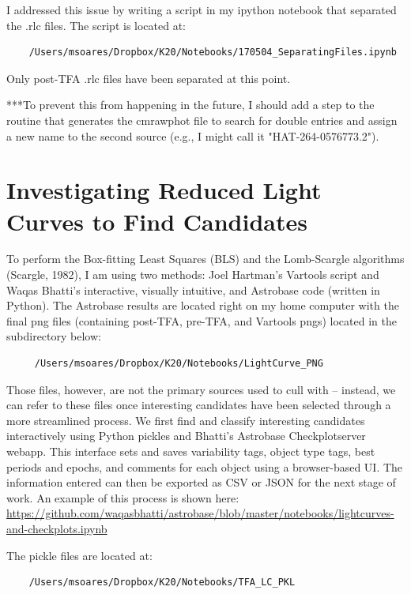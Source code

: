 \documentclass[11pt,letterpaper]{book} %
\begin{document}
I addressed this issue by writing a script in my ipython notebook that separated the .rlc files. The script is located at:
\begin{verbatim}
    /Users/msoares/Dropbox/K20/Notebooks/170504_SeparatingFiles.ipynb
\end{verbatim}

Only post-TFA .rlc files have been separated at this point. 

***To prevent this from happening in the future, I should add a step to the routine that generates the cmrawphot file to search for double entries and assign a new name to the second source (e.g., I might call it "HAT-264-0576773.2").


\chapter*{Investigating Reduced Light Curves to Find Candidates}
To perform the Box-fitting Least Squares (BLS) and the Lomb-Scargle algorithms (Scargle, 1982), I am using two methods: Joel Hartman's Vartools script and Waqas Bhatti's interactive, visually intuitive, and Astrobase code (written in Python). The Astrobase results are located right on my home computer with the final png files (containing post-TFA, pre-TFA, and Vartools pngs) located in the subdirectory below: 

\begin{verbatim}
     /Users/msoares/Dropbox/K20/Notebooks/LightCurve_PNG
\end{verbatim}

Those files, however, are not the primary sources used to cull with -- instead, we can refer to these files once interesting candidates have been selected through a more streamlined process.
We first find and classify interesting candidates interactively using Python pickles and Bhatti's Astrobase Checkplotserver webapp. This interface sets and saves variability tags, object type tags, best periods and epochs, and comments for each object using a browser-based UI. The information entered can then be exported as CSV or JSON for the next stage of work. An example of this process is shown here: \url{https://github.com/waqasbhatti/astrobase/blob/master/notebooks/lightcurves-and-checkplots.ipynb}

The pickle files are located at:
\begin{verbatim}
    /Users/msoares/Dropbox/K20/Notebooks/TFA_LC_PKL
\end{verbatim}
\end{document}
